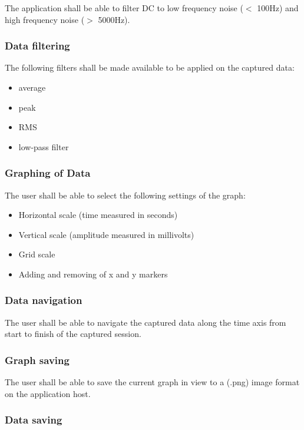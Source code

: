 \documentclass[12pt,a4paper]{article}
\begin{document}
The application shall be able to filter DC to low frequency noise ($<$ 100Hz) and high frequency noise ($>$ 5000Hz). 

\subsubsection{Data filtering}

The following filters shall be made available to be applied on the captured data:

\begin{itemize}
\item average
\item peak
\item RMS
\item low-pass filter
\end{itemize}

\subsubsection{Graphing of Data}

The user shall be able to select the following settings of the graph:

\begin{itemize}
\item Horizontal scale (time measured in seconds)
\item Vertical scale (amplitude measured in millivolts)
\item Grid scale 
\item Adding and removing of x and y markers
\end{itemize}

\subsubsection{Data navigation}

The user shall be able to navigate the captured data along the time axis from start to finish of the captured session.

\subsubsection{Graph saving}

The user shall be able to save the current graph in view to a (.png) image format on the application host.

\subsubsection{Data saving}
\end{document}
